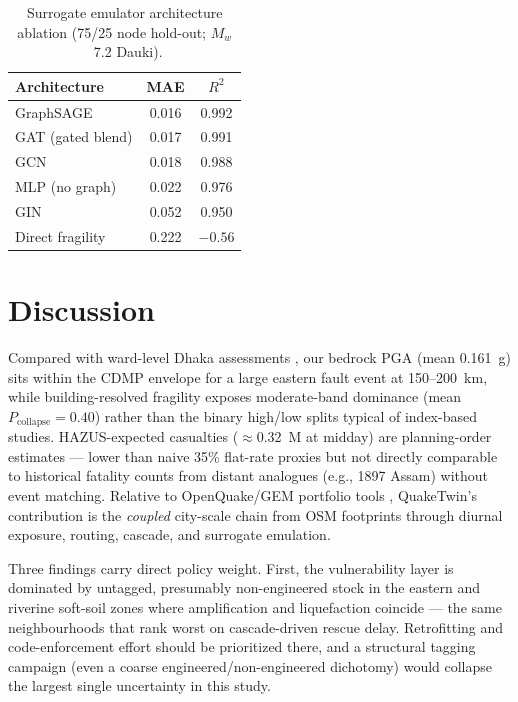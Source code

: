 \documentclass[a4paper,fleqn]{cas-sc}
\begin{document}
\begin{table}[pos=htbp]
  \centering
  \caption{Surrogate emulator architecture ablation (75/25 node hold-out; $M_w$~7.2 Dauki).}
  \label{tab:gnn_ablation}
  \small
  \begin{tabular}{lcc}
    \toprule
    Architecture & MAE & $R^2$ \\
    \midrule
    GraphSAGE       & 0.016 & 0.992 \\
    GAT (gated blend) & 0.017 & 0.991 \\
    GCN             & 0.018 & 0.988 \\
    MLP (no graph)  & 0.022 & 0.976 \\
    GIN             & 0.052 & 0.950 \\
    Direct fragility & 0.222 & $-0.56$ \\
    \bottomrule
  \end{tabular}
\end{table}

\section{Discussion}
Compared with ward-level Dhaka assessments \cite{cdmp2009,islam2020}, our
bedrock PGA (mean 0.161~g) sits within the CDMP envelope for a large eastern
fault event at 150--200~km, while building-resolved fragility exposes
moderate-band dominance (mean $P_{\mathrm{collapse}} = 0.40$) rather than
the binary high/low splits typical of index-based studies. HAZUS-expected
casualties ($\approx$0.32~M at midday) are planning-order estimates --- lower
than naive 35\% flat-rate proxies but not directly comparable to historical
fatality counts from distant analogues (e.g., 1897 Assam) without event
matching. Relative to OpenQuake/GEM portfolio tools \cite{pagani2014,gem2023},
QuakeTwin's contribution is the \textit{coupled} city-scale chain from OSM
footprints through diurnal exposure, routing, cascade, and surrogate emulation.

Three findings carry direct policy weight. First, the vulnerability layer is
dominated by untagged, presumably non-engineered stock in the eastern and
riverine soft-soil zones where amplification and liquefaction coincide ---
the same neighbourhoods that rank worst on cascade-driven rescue delay.
Retrofitting and code-enforcement effort should be prioritized there, and a
structural tagging campaign (even a coarse engineered/non-engineered
dichotomy) would collapse the largest single uncertainty in this study.
\end{document}
